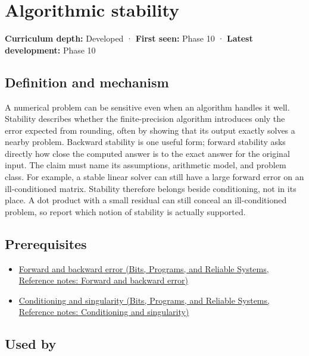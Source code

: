 \hypertarget{appendix-aa2bf0d79639}{}\label{referencestart:appendix-aa2bf0d79639}
\section{Algorithmic stability}\label{appendix-aa2bf0d79639-algorithmic-stability}

\textbf{Curriculum depth:} Developed · \textbf{First seen:} Phase 10 · \textbf{Latest development:} Phase 10

\subsection{Definition and mechanism}\label{appendix-aa2bf0d79639-definition-and-mechanism}

A numerical problem can be sensitive even when an algorithm handles it well. Stability describes whether the finite-precision algorithm introduces only the error expected from rounding, often by showing that its output exactly solves a nearby problem. Backward stability is one useful form; forward stability asks directly how close the computed answer is to the exact answer for the original input. The claim must name its assumptions, arithmetic model, and problem class. For example, a stable linear solver can still have a large forward error on an ill-conditioned matrix. Stability therefore belongs beside conditioning, not in its place. A dot product with a small residual can still conceal an ill-conditioned problem, so report which notion of stability is actually supported.

\subsection{Prerequisites}\label{appendix-aa2bf0d79639-prerequisites}

\begin{itemize}
\tightlist
\item
  \href{../01-Bits-Programs-and-Reliable-Systems/main.pdf\#nameddest=appendix-a7fbaf6d1b1c}{Forward and backward error (Bits, Programs, and Reliable Systems, Reference notes: Forward and backward error)}
\item
  \href{../01-Bits-Programs-and-Reliable-Systems/main.pdf\#nameddest=appendix-8f6a01f284a7}{Conditioning and singularity (Bits, Programs, and Reliable Systems, Reference notes: Conditioning and singularity)}
\end{itemize}

\subsection{Used by}\label{appendix-aa2bf0d79639-used-by}


